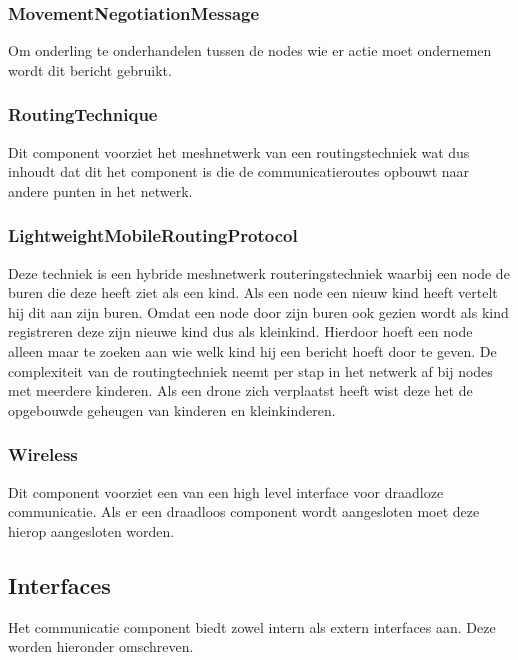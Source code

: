 \documentclass[a4paper, 11pt, oneside]{report}
\begin{document}
\subsubsection{MovementNegotiationMessage}	
\label{architectural:subcomponenten:MovementNegotiationMessage}
Om onderling te onderhandelen tussen de nodes wie er actie moet ondernemen wordt dit bericht gebruikt.

\subsubsection{RoutingTechnique}
\label{architectural:subcomponenten:RoutingTechnique}
Dit component voorziet het meshnetwerk van een routingstechniek wat dus inhoudt dat dit het component is die de communicatieroutes opbouwt naar andere punten in het netwerk.

\subsubsection{LightweightMobileRoutingProtocol}
\label{architectural:subcomponenten:LightweightMobileRoutingProtocol}
Deze techniek is een hybride meshnetwerk routeringstechniek waarbij een node de buren die deze heeft ziet als een kind.
Als een node een nieuw kind heeft vertelt hij dit aan zijn buren.
Omdat een node door zijn buren ook gezien wordt als kind registreren deze zijn nieuwe kind dus als kleinkind.
Hierdoor hoeft een node alleen maar te zoeken aan wie welk kind hij een bericht hoeft door te geven. 
De complexiteit van de routingtechniek neemt per stap in het netwerk af bij nodes met meerdere kinderen.
Als een drone zich verplaatst heeft wist deze het de opgebouwde geheugen van kinderen en kleinkinderen. 

\subsubsection{Wireless}
\label{architectural:subcomponenten:Wireless}
Dit component voorziet een  van een high level interface voor draadloze communicatie.
Als er een draadloos component wordt aangesloten moet deze hierop aangesloten worden. 
\subsection{Interfaces}
\label{DetailedDesign:CommunicatieComponentDiagram:interface}
Het communicatie component biedt zowel intern als extern interfaces aan. Deze worden hieronder omschreven.
\end{document}
